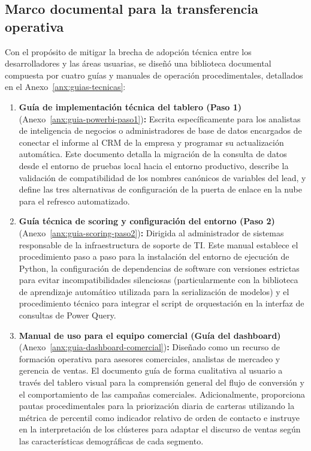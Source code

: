 \subsection{Marco documental para la transferencia operativa}
\label{sec:transferencia-operativa}
Con el propósito de mitigar la brecha de adopción técnica entre los desarrolladores y las áreas usuarias, se diseñó una biblioteca documental compuesta por cuatro guías y manuales de operación procedimentales, detallados en el Anexo~\ref{anx:guias-tecnicas}:
\begin{enumerate}
    \item \textbf{Guía de implementación técnica del tablero (Paso 1)} (Anexo~\ref{anx:guia-powerbi-paso1})\textbf{:} Escrita específicamente para los analistas de inteligencia de negocios o administradores de base de datos encargados de conectar el informe al CRM de la empresa y programar su actualización automática. Este documento detalla la migración de la consulta de datos desde el entorno de pruebas local hacia el entorno productivo, describe la validación de compatibilidad de los nombres canónicos de variables del lead, y define las tres alternativas de configuración de la puerta de enlace en la nube para el refresco automatizado.
    \item \textbf{Guía técnica de scoring y configuración del entorno (Paso 2)} (Anexo~\ref{anx:guia-scoring-paso2})\textbf{:} Dirigida al administrador de sistemas responsable de la infraestructura de soporte de TI. Este manual establece el procedimiento paso a paso para la instalación del entorno de ejecución de Python, la configuración de dependencias de software con versiones estrictas para evitar incompatibilidades silenciosas (particularmente con la biblioteca de aprendizaje automático utilizada para la serialización de modelos) y el procedimiento técnico para integrar el script de orquestación en la interfaz de consultas de Power Query.
    \item \textbf{Manual de uso para el equipo comercial (Guía del dashboard)} (Anexo~\ref{anx:guia-dashboard-comercial})\textbf{:} Diseñado como un recurso de formación operativa para asesores comerciales, analistas de mercadeo y gerencia de ventas. El documento guía de forma cualitativa al usuario a través del tablero visual para la comprensión general del flujo de conversión y el comportamiento de las campañas comerciales. Adicionalmente, proporciona pautas procedimentales para la priorización diaria de carteras utilizando la métrica de percentil como indicador relativo de orden de contacto e instruye en la interpretación de los clústeres para adaptar el discurso de ventas según las características demográficas de cada segmento.

\end{enumerate}
